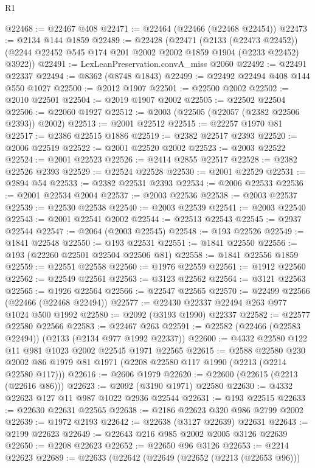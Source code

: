 \begin{lexlean}{R1}
\begin{coremodule}
@22468 := @22467 @408
@22471 := @22464 (@22466 (@22468 @22454))
@22473 := @2134 @144 @1859
@22489 := @22428
    (@22471
      (@2133 (@22473 @22452))
      (@2244 @22452 @545 @174 @201 @2002 @2002 @1859 @1904 (@2233 @22452) @3922))
@22491 := LexLeanPreservation.convA_miss @2060
@22492 := @22491 @22337
@22494 := @8362 (@8748 @1843)
@22499 := @22492 @22494 @408 @144 @550 @1027
@22500 := @2012 @1907
@22501 := @22500 @2002
@22502 := @2010 @22501
@22504 := @2019 @1907 @2002
@22505 := @22502 @22504
@22506 := @22060 @1927
@22512 := @2003 (@22505 (@22057 (@2382 @22506 @2393)) @2002)
@22513 := @2001 @22512
@22515 := @22257 @1970 @81
@22517 := @2386 @22515 @1886
@22519 := @2382 @22517 @2393
@22520 := @2006 @22519
@22522 := @2001 @22520 @2002
@22523 := @2003 @22522
@22524 := @2001 @22523
@22526 := @2414 @2855 @22517
@22528 := @2382 @22526 @2393
@22529 := @22524 @22528
@22530 := @2001 @22529
@22531 := @2894 @54
@22533 := @2382 @22531 @2393
@22534 := @2006 @22533
@22536 := @2001 @22534 @2004
@22537 := @2003 @22536
@22538 := @2003 @22537
@22539 := @22530 @22538
@22540 := @2003 @22539
@22541 := @2003 @22540
@22543 := @2001 @22541 @2002
@22544 := @22513 @22543
@22545 := @2937 @22544
@22547 := @2064 (@2003 @22545)
@22548 := @193 @22526
@22549 := @1841 @22548
@22550 := @193 @22531
@22551 := @1841 @22550
@22556 := @193 (@22260 @22501 @22504 @22506 @81)
@22558 := @1841 @22556 @1859
@22559 := @22551 @22558
@22560 := @1976 @22559
@22561 := @1912 @22560
@22562 := @22549 @22561
@22563 := @3123 @22562
@22564 := @3121 @22563
@22565 := @1926 @22564
@22566 := @22547 @22565
@22570 := @22499 @22566 (@22466 (@22468 @22494))
@22577 := @22430 @22337 @22494 @263 @977 @1024 @500 @1992
@22580 := @2092 (@3193 @1990) @22337
@22582 := @22577 @22580 @22566
@22583 := @22467 @263
@22591 := @22582 (@22466 (@22583 @22494)) (@2133 (@2134 @977 @1992 @22337))
@22600 := @4332 @22580 @122 @11 @981 @1023 @2002 @22545 @1971 @22565
@22615 := @2588
    @22580
    @230
    @2002
    @86
    @1979
    @81
    @1971
    (@2208 @22580 @117 @1990 (@2213 (@2214 @22580 @117)))
@22616 := @2606 @1979
@22620 := @22600 (@22615 (@2213 (@22616 @86)))
@22623 := @2092 (@3190 @1971) @22580
@22630 := @4332 @22623 @127 @11 @987 @1022 @2936 @22544
@22631 := @193 @22515
@22633 := @22630 @22631 @22565
@22638 := @2186 @22623 @320 @986 @2799 @2002
@22639 := @1972 @2193
@22642 := @22638 (@3127 @22639) @22631
@22643 := @2199 @22623
@22649 := @22643 @216 @985 @2002 @2005 @3126 @22639
@22650 := @2208 @22623
@22652 := @22650 @96 @3126
@22653 := @2214 @22623
@22689 := @22633
    (@22642
      (@22649
        (@22652 (@2213 (@22653 @96)))

\end{coremodule}
\end{lexlean}
